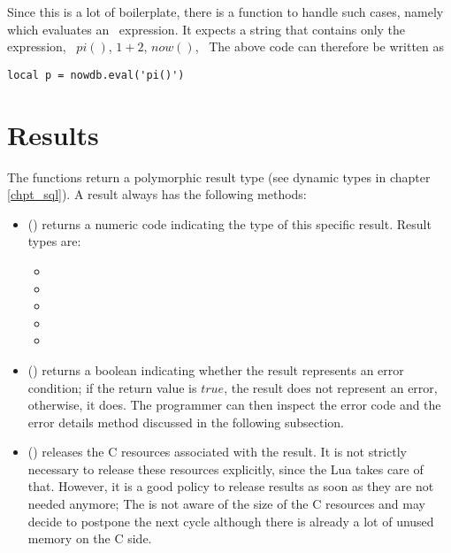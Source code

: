 Since this is a lot of boilerplate,
there is a function to handle such cases,
namely  which evaluates
an \sql\ expression. It expects a string that
contains only the expression, \eg\
$pi()$, $1+2$, $now()$, \etc\
The above code can therefore be written as

\begin{lua}
\begin{lstlisting}
local p = nowdb.eval('pi()')
\end{lstlisting}
\end{lua}

\section{Results}
The  functions return
a polymorphic result type (see dynamic types
in chapter \ref{chpt_sql}).
A result always has the following methods:
\begin{itemize}
\item {}()
      returns a numeric code indicating
      the type of this specific result.
      Result types are:
      \begin{itemize}
      \item {}
      \item {}
      \item \term{nowdb.REPORT}
      \item {}
      \item {}
      \end{itemize}
\item {}()
      returns a boolean indicating whether
      the result represents an error condition;
      if the return value is $true$,
      the result does not represent an error,
      otherwise, it does.
      The programmer can then inspect the error code
      and the error details method discussed in the
      following subsection.
\item \term{release}()
      releases the C resources associated with the result.
      It is not strictly necessary to release these resources
      explicitly, since the Lua  takes care of that.
      However, it is a good policy to release results as soon
      as they are not needed anymore; The \acronym{gc} is not
      aware of the size of the C resources and may decide to
      postpone the next cycle although there is already
      a lot of unused memory on the C side.
\end{itemize}

